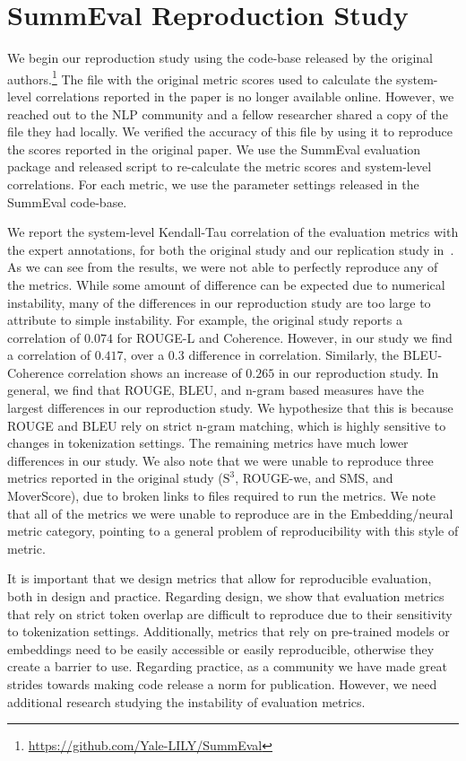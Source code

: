 
\section{SummEval Reproduction Study}\label{sec:6-chapter-summeval-repro}

We begin our reproduction study using the code-base released by the original authors.\footnote{\url{https://github.com/Yale-LILY/SummEval}} The file with the original metric scores used to calculate the system-level correlations reported in the paper is no longer available online. However, we reached out to the NLP community and a fellow researcher shared a copy of the file they had locally. We verified the accuracy of this file by using it to reproduce the scores reported in the original paper. We use the SummEval evaluation package and released script to re-calculate the metric scores and system-level correlations. For each metric, we use the parameter settings released in the SummEval code-base.

We report the system-level Kendall-Tau correlation of the evaluation metrics with the expert annotations, for both the original study and our replication study in~. As we can see from the results, we were not able to perfectly reproduce any of the metrics. While some amount of difference can be expected due to numerical instability, many of the differences in our reproduction study are too large to attribute to simple instability. For example, the original study reports a correlation of $0.074$ for ROUGE-L and Coherence. However, in our study we find a correlation of $0.417$, over a $0.3$ difference in correlation. Similarly, the BLEU-Coherence correlation shows an increase of $0.265$ in our reproduction study. In general, we find that ROUGE, BLEU, and n-gram based measures have the largest differences in our reproduction study. We hypothesize that this is because ROUGE and BLEU rely on strict n-gram matching, which is highly sensitive to changes in tokenization settings. The remaining metrics have much lower differences in our study. We also note that we were unable to reproduce three metrics reported in the original study ($\mathrm{S}^3$, ROUGE-we, and SMS, and MoverScore), due to broken links to files required to run the metrics. We note that all of the metrics we were unable to reproduce are in the Embedding/neural metric category, pointing to a general problem of reproducibility with this style of metric.


It is important that we design metrics that allow for reproducible evaluation, both in design and practice. Regarding design, we show that evaluation metrics that rely on strict token overlap are difficult to reproduce due to their sensitivity to tokenization settings. Additionally, metrics that rely on pre-trained models or embeddings need to be easily accessible or easily reproducible, otherwise they create a barrier to use. Regarding practice, as a community we have made great strides towards making code release a norm for publication. However, we need additional research studying the instability of evaluation metrics.

\clearpage

